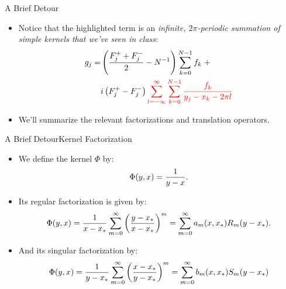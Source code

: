 \documentclass{beamer}
\newcommand{\parens}[1]{\left(#1\right)}
\begin{document}
\begin{frame}{A Brief Detour}
  \begin{itemize}
  \item Notice that the highlighted term is an \emph{infinite,
      $2\pi$-periodic summation of simple kernels that we've seen in class}:
    \begin{align*}
      g_j = & \parens{{F_j^+ + F_j^- \over 2} - N^{-1}} \sum_{k=0}^{N-1} f_k \; + \\ & i \parens{F_j^+ - F_j^-} \textcolor{red}{\sum_{l=-\infty}^\infty \sum_{k=0}^{N-1} {f_k \over y_j - x_k - 2\pi l}}
    \end{align*}
  \item We'll summarize the relevant factorizations and translation operators.
  \end{itemize}
\end{frame}

\begin{frame}{A Brief Detour}{Kernel Factorization}
  \begin{itemize}
  \item We define the kernel $\Phi$ by:
    \begin{align*}
      \Phi(y, x) = {1 \over y - x}.
    \end{align*}
    \pause
  \item Its regular factorization is given by:
    \begin{align*}
      \Phi(y, x) = {1 \over x - x_*} \sum_{m=0}^\infty \parens{y - x_* \over x - x_*}^m = \sum_{m=0}^\infty a_m(x, x_*) R_m(y - x_*).
    \end{align*}
    \pause
  \item And its singular factorization by:
    \begin{align*}
      \Phi(y, x) = {1 \over y - x_*} \sum_{m=0}^\infty \parens{x - x_* \over y - x_*}^m = \sum_{m=0}^\infty b_m(x, x_*) S_m(y - x_*)
    \end{align*}
  \end{itemize}
\end{frame}
\end{document}
